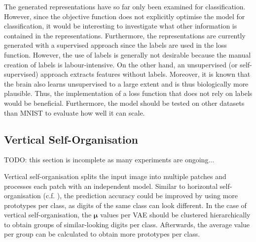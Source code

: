 The generated representations have so far only been examined for classification. However, since the objective function does not explicitly optimise the model for classification, it would be interesting to investigate what other information is contained in the representations. Furthermore, the representations are currently generated with a supervised approach since the labels are used in the loss function. However, the use of labels is generally not desirable because the manual creation of labels is labour-intensive. On the other hand, an unsupervised (or self-supervised) approach extracts features without labels. Moreover, it is known that the brain also learns unsupervised to a large extent and is thus biologically more plausible.
Thus, the implementation of a loss function that does not rely on labels would be beneficial. Furthermore, the model should be tested on other datasets than MNIST to evaluate how well it can scale.




\subsection{Vertical Self-Organisation}
TODO: this section is incomplete as many experiments are ongoing...

Vertical self-organisation splits the input image into multiple patches and processes each patch with an independent model.
Similar to horizontal self-organisation (c.f. ), the prediction accuracy could be improved by using more prototypes per class, as digits of the same class can look different. In the case of vertical self-organisation, the $\boldsymbol{\mu}$ values per VAE should be clustered hierarchically to obtain groups of similar-looking digits per class. Afterwards, the average value per group can be calculated to obtain more prototypes per class.


